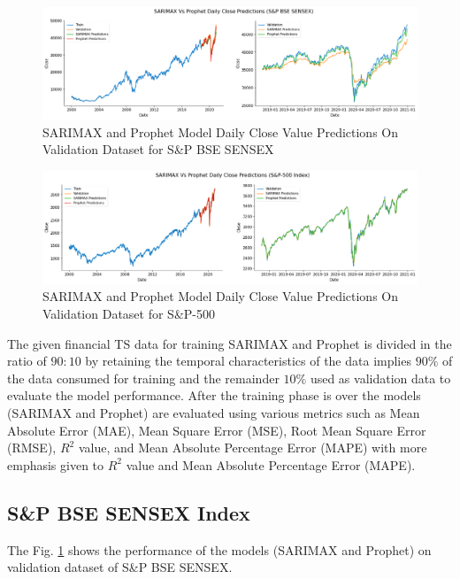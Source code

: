 \documentclass[conference]{IEEEtran}
\begin{document}
\begin{figure}[ht]
	\centering
	\includegraphics[scale = 1.5, width = \textwidth]{images/SARIMAX-Prophet-SENSEX-Predictions.png}
	\vspace{-0.3in}
	\caption{SARIMAX and Prophet Model Daily Close Value Predictions On Validation Dataset for S\&P BSE SENSEX}
	\label{fig:sarimax_prophet_results_sensex_index}
\end{figure}

\begin{figure}[ht]
	\centering
	\includegraphics[scale = 1.5, width = \textwidth]{images/SARIMAX-Prophet-S&P-500-Predictions.png}
	\vspace{-0.3in}
	\caption{SARIMAX and Prophet Model Daily Close Value Predictions On Validation Dataset for S\&P-500}
	\label{fig: sarimax_prophet_results_for_s_and_p_500_index}
\end{figure}

The given financial TS data for training SARIMAX and Prophet is divided in the ratio of $90:10$ by retaining the temporal characteristics of the data implies $90\%$ of the data consumed for training and the remainder $10\%$ used as validation data to evaluate the model performance. After the training phase is over the models (SARIMAX and Prophet) are evaluated using various metrics such as Mean Absolute Error (MAE), Mean Square Error (MSE), Root Mean Square Error (RMSE), $R^{2}$ value, and Mean Absolute Percentage Error (MAPE) with more emphasis given to $R^{2}$ value and Mean Absolute Percentage Error (MAPE).

\subsection{S\&P BSE SENSEX Index}
The Fig. \ref{fig:sarimax_prophet_results_sensex_index} shows the performance of the models (SARIMAX and Prophet) on validation dataset of S\&P BSE SENSEX.
\end{document}
